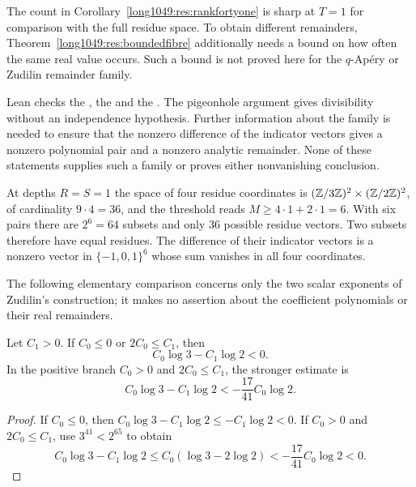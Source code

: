 \documentclass[11pt]{article}
\begin{document}
The count in Corollary~\ref{long1049:res:rankfortyone} is sharp at
$T=1$ for comparison with the full residue space. To obtain different
remainders, Theorem~\ref{long1049:res:boundedfibre} additionally needs
a bound on how often the same real value occurs. Such a bound is not
proved here for the $q$-Ap\'ery or Zudilin remainder family.

\noindent Lean checks the
, the
 and the
. The pigeonhole argument gives
divisibility without an independence hypothesis. Further information
about the family is needed to ensure that the nonzero difference of the
indicator vectors gives a nonzero polynomial pair and a nonzero analytic
remainder. None of these statements supplies such a family or proves
either nonvanishing conclusion.

\begin{example}\label{long1049:ex:jetcount}
At depths \(R=S=1\) the space of four residue coordinates is
\((\mathbb{Z}/3\mathbb{Z})^2\times(\mathbb{Z}/2\mathbb{Z})^2\), of cardinality \(9\cdot4=36\), and the threshold
reads \(M\ge4\cdot1+2\cdot1=6\). With six pairs there are \(2^{6}=64\)
subsets and only \(36\) possible residue vectors. Two subsets therefore
have equal residues. The difference of their indicator vectors is a
nonzero vector in \(\{-1,0,1\}^{6}\) whose sum vanishes in all four coordinates.
\end{example}

The following elementary comparison concerns only the two scalar
exponents of Zudilin's construction; it makes no assertion about
the coefficient polynomials or their real remainders.

\begin{theorem}\label{long1049:res:scalar}
Let \(C_1>0\).  If \(C_0\le0\) or \(2C_0\le C_1\), then
\[
 C_0\log 3-C_1\log 2<0.
\]
In the positive branch $C_0>0$ and $2C_0\le C_1$, the stronger estimate is
\[
 C_0\log3-C_1\log2< -\frac{17}{41}C_0\log2.
\]
\end{theorem}

\begin{proof}
If $C_0\le0$, then $C_0\log3-C_1\log2\le-C_1\log2<0$.
If $C_0>0$ and $2C_0\le C_1$, use $3^{41}<2^{65}$ to obtain
\[
 C_0\log3-C_1\log2
 \le C_0(\log3-2\log2)
 <-\frac{17}{41}C_0\log2<0.
\]
\end{proof}
\end{document}
